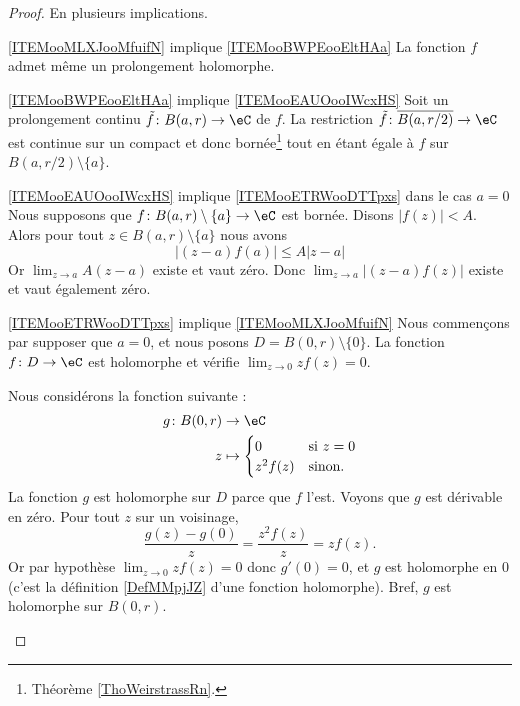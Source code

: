 \begin{proof}
    En plusieurs implications.
    \begin{subproof}
        \item[\ref{ITEMooMLXJooMfuifN} implique \ref{ITEMooBWPEooEltHAa}]
            La fonction \( f\) admet même un prolongement holomorphe.
        \item[\ref{ITEMooBWPEooEltHAa} implique \ref{ITEMooEAUOooIWcxHS}]
            Soit un prolongement continu \( \tilde f\colon B(a,r)\to \eC\) de \( f\). La restriction \( \tilde f\colon \overline{ B(a,r/2) }\to \eC\) est continue sur un compact et donc bornée\footnote{Théorème \ref{ThoWeirstrassRn}.} tout en étant égale à \( f\) sur \( B(a,r/2)\setminus\{ a \}\).
        \item[\ref{ITEMooEAUOooIWcxHS} implique \ref{ITEMooETRWooDTTpxs} dans le cas \( a=0\)]
            Nous supposons que \( f\colon B(a,r)\setminus\{ a \}\to \eC\) est bornée. Disons \( | f(z) |<A\). Alors pour tout \( z\in B(a,r)\setminus\{ a \}\) nous avons
            \begin{equation}
                | (z-a)f(a) |\leq A| z-a |
            \end{equation}
            Or $\lim_{z\to a}A(z-a)$ existe et vaut zéro. Donc \( \lim_{z\to a}| (z-a)f(z) |\) existe et vaut également zéro.
        \item[\ref{ITEMooETRWooDTTpxs} implique \ref{ITEMooMLXJooMfuifN}]
            Nous commençons par supposer que \( a=0\), et nous posons \( D=B(0,r)\setminus\{ 0 \}\). La fonction \( f\colon D\to \eC\) est holomorphe et vérifie \( \lim_{z\to 0}zf(z)=0\).

            Nous considérons la fonction suivante :
            \begin{equation}
                \begin{aligned}
                    g\colon B(0,r)&\to \eC \\
                    z&\mapsto \begin{cases}
                        0    &   \text{si } z=0\\
                        z^2f(z)    &    \text{sinon. }
                    \end{cases}
                \end{aligned}
            \end{equation}
            La fonction \( g\) est holomorphe sur \( D\) parce que \( f\) l'est. Voyons que \( g\) est dérivable en zéro. Pour tout \( z\) sur un voisinage,
            \begin{equation}
                \frac{ g(z)-g(0) }{ z }=\frac{ z^2f(z) }{ z }=zf(z).
            \end{equation}
            Or par hypothèse \( \lim_{z\to 0}zf(z)=0\) donc \( g'(0)=0\), et \( g\) est holomorphe en \( 0\) (c'est la définition \ref{DefMMpjJZ} d'une fonction holomorphe). Bref, \( g\) est holomorphe sur \( B(0,r)\).


\end{subproof}
\end{proof}
